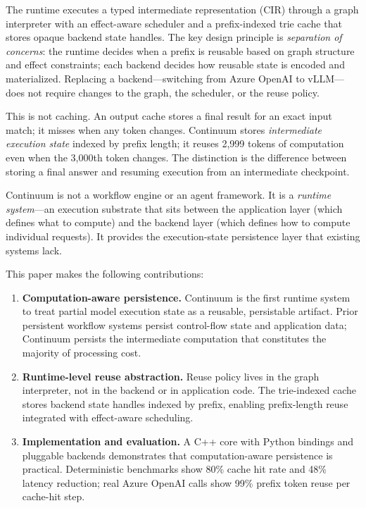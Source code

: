\documentclass[10pt,twocolumn]{article}
\begin{document}
The runtime executes a typed intermediate representation (CIR) through a graph interpreter with an effect-aware scheduler and a prefix-indexed trie cache that stores opaque backend state handles. The key design principle is \emph{separation of concerns}: the runtime decides when a prefix is reusable based on graph structure and effect constraints; each backend decides how reusable state is encoded and materialized. Replacing a backend---switching from Azure OpenAI to vLLM---does not require changes to the graph, the scheduler, or the reuse policy.

This is not caching. An output cache stores a final result for an exact input match; it misses when any token changes. Continuum stores \emph{intermediate execution state} indexed by prefix length; it reuses 2,999 tokens of computation even when the 3,000th token changes. The distinction is the difference between storing a final answer and resuming execution from an intermediate checkpoint.

Continuum is not a workflow engine or an agent framework. It is a \emph{runtime system}---an execution substrate that sits between the application layer (which defines what to compute) and the backend layer (which defines how to compute individual requests). It provides the execution-state persistence layer that existing systems lack.

This paper makes the following contributions:
\begin{enumerate}[leftmargin=*]
  \item \textbf{Computation-aware persistence.} Continuum is the first runtime system to treat partial model execution state as a reusable, persistable artifact. Prior persistent workflow systems persist control-flow state and application data; Continuum persists the intermediate computation that constitutes the majority of processing cost.
  \item \textbf{Runtime-level reuse abstraction.} Reuse policy lives in the graph interpreter, not in the backend or in application code. The trie-indexed cache stores backend state handles indexed by prefix, enabling prefix-length reuse integrated with effect-aware scheduling.
  \item \textbf{Implementation and evaluation.} A C++ core with Python bindings and pluggable backends demonstrates that computation-aware persistence is practical. Deterministic benchmarks show 80\% cache hit rate and 48\% latency reduction; real Azure OpenAI calls show 99\% prefix token reuse per cache-hit step.
\end{enumerate}
\end{document}
